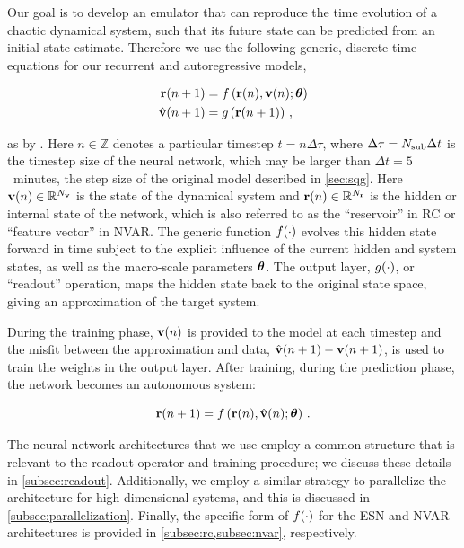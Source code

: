 \documentclass[draft]{agujournal2019}
\newcommand{\citet}{\citeA}
\begin{document}
Our goal is to develop an emulator that can reproduce the time evolution of a chaotic dynamical system, such that its future state can be predicted from an initial
state estimate.
Therefore we use the following generic, discrete-time equations for our recurrent and autoregressive models,
\begin{linenomath*}\begin{equation}
    \begin{aligned}
        \mathbf{r}(n+1) &= f\left(
            \mathbf{r}(n), \mathbf{v}(n); \bm{\theta}
            \right) \\
        \hat{\mathbf{v}}(n+1) &= g \left( \mathbf{r}(n+1) \right) \, ,
    \end{aligned}
    \label{eq:rnn}
\end{equation}\end{linenomath*}
as by \citet{goodfellow_sequence_2016}.
Here $n\in\mathbb{Z}$ denotes a particular timestep $t = n\Delta \tau$, where $\Delta\tau = N_\text{sub}\Delta t$ is the timestep size of the neural network,
which may be larger than $\Delta t=5$~minutes, the step size of the original model described in
\cref{sec:sqg}.
Here $\mathbf{v}(n)\in\mathbb{R}^{N_{\mathbf{v}}}$ is the state of the dynamical system and $\mathbf{r}(n)\in\mathbb{R}^{N_{\mathbf{r}}}$ is the hidden or internal state of the network, which is also referred to as the ``reservoir'' in RC or ``feature vector'' in
NVAR.
The generic function $f(\cdot)$ evolves this hidden state forward in
time subject to the explicit
influence of the current hidden and system states, as well as the macro-scale
parameters $\bm{\theta}$.
The output layer,
$g(\cdot)$, or ``readout'' operation,
maps the hidden state back to the original state space, giving an
approximation of the target system.

During the training phase, $\mathbf{v}(n)$ is provided to the model at each timestep
and the misfit between the approximation and data,
$\hat{\mathbf{v}}(n+1) - \mathbf{v}(n+1)$, is used to train the weights in the output
layer.
After training, during the prediction phase, the network becomes an autonomous
system:
\begin{linenomath*}\begin{equation*}
    \mathbf{r}(n+1) = f\left(
        \mathbf{r}(n), \hat{\mathbf{v}}(n); \bm{\theta}\right) \, .
\end{equation*}\end{linenomath*}

The neural network architectures that we use employ a common
structure that is relevant to the readout operator and training
procedure; we discuss these details in \cref{subsec:readout}.
Additionally, we employ a similar strategy to parallelize the architecture for
high dimensional systems, and this is discussed in
\cref{subsec:parallelization}.
Finally, the specific form of $f(\cdot)$ for the ESN and NVAR architectures
is provided in \cref{subsec:rc,subsec:nvar},
respectively.
\end{document}

